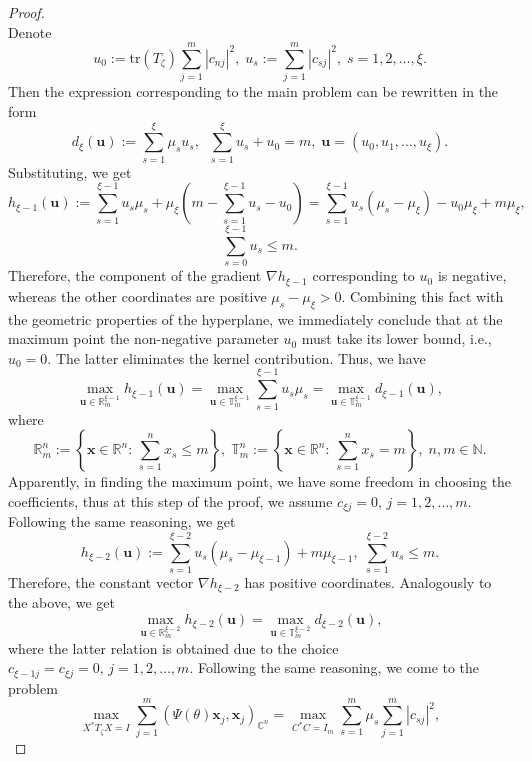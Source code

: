 \documentclass[a4paper,twoside,12pt]{article}
\begin{document}
\begin{proof}
$$$$
Denote
$$
u_{0}:=\mathrm{tr}(T_{\zeta})\sum\limits_{j=1}^{m}|c _{nj }|^{2},\;u_{s}:=\sum\limits_{j=1}^{m}  |c_{sj }|^{2},\;s=1,2,\ldots,\xi.
$$
Then  the expression corresponding to the  main problem can be rewritten in the form
$$
d_{\xi}(\mathbf{u}) :=\sum\limits_{s=1}^{\xi}\mu _{s}u_{s}  ,\;\;\sum\limits_{s=1}^{\xi}u_{s}+u_{0}=m,\;\mathbf{u}=(u_{0},u_{1},\ldots,u_{\xi}).
$$
Substituting, we get
$$
h_{\xi-1}(\mathbf{u}):=\sum\limits_{s=1}^{\xi-1}u_{s}\mu _{s}+\mu _{\xi}\left(m-\sum\limits_{s=1}^{\xi-1}u_{s}-u_{0}\right)=
\sum\limits_{s=1}^{\xi-1}u_{s} \left(\mu _{s}-\mu_{\xi}\right)-u_{0}\mu _{\xi}+m \mu _{\xi},
$$
$$
\sum\limits_{s=0}^{\xi-1}u_{s}\leq m.
$$
Therefore, the component of the gradient $\nabla h_{\xi-1}$ corresponding to   $u_{0}$ is   negative, whereas the  other  coordinates are positive  $ \mu_s - \mu_{\xi} > 0.$ Combining this fact with the geometric properties of the hyperplane, we immediately conclude that at the maximum point the non-negative parameter $u_{0}$ must take  its lower bound, i.e., $u_{0} = 0.$ The latter eliminates the kernel contribution. Thus, we  have
$$
\max \limits_{\mathbf{u}\in \mathbb{R}^{\xi-1}_{m}}  h_{\xi-1}(\mathbf{u})= \max\limits_{\mathbf{u}\in \mathbb{T}^{\xi-1}_{m}}\sum\limits_{s=1}^{\xi-1}u_{s}\mu_{s}=  \max\limits_{\mathbf{u}\in \mathbb{T}^{\xi-1}_{m}}  d_{\xi-1}(\mathbf{u}),
$$
where
$$
\mathbb{R}^{n}_{m}:=\left\{\mathbf{x}\in \mathbb{R}^{n}:\, \sum\limits_{s=1}^{n}x_{s}\leq m \right\},\;\mathbb{T}^{n}_{m}:=\left\{\mathbf{x}\in \mathbb{R}^{n}:\, \sum\limits_{s=1}^{n}x_{s}= m \right\},\;n,m\in \mathbb{N}.
$$
Apparently, in finding the maximum point, we have some freedom in choosing the coefficients, thus at this step of the proof, we   assume    $c_{\xi j}=0,\,j=1,2,\ldots,m.$
Following  the same reasoning, we get
\begin{equation*}
h_{\xi-2}(\mathbf{u}):=
\sum\limits_{s=1}^{\xi-2}u_{s} \left(\mu _{s}-\mu _{\xi-1}\right)+m \mu _{\xi-1},\;\sum\limits_{s=1}^{\xi-2}u_{s}\leq m.
\end{equation*}
Therefore, the constant vector $\nabla h_{\xi-2}$ has positive coordinates. Analogously to the above, we get
$$
\max\limits_{\mathbf{u}\in \mathbb{R}^{\xi-2}_{m}}  h_{\xi-2}(\mathbf{u})=   \max\limits_{\mathbf{u}\in \mathbb{T}^{\xi-2}_{m}}  d_{\xi-2}(\mathbf{u}),
$$
where the latter relation is obtained due to the choice  $c_{\xi-1j}=c_{\xi j}=0,\,j=1,2,\ldots,m.$
Following the same reasoning, we come to the problem
$$
\max\limits_{X^{\ast}T_{\zeta}X= I} \sum\limits_{j=1}^{m}(\Psi(\theta)\mathbf{x}_{j},\mathbf{x}_{j})_{\mathbb{C}^{n}}=\max\limits_{ C ^{\ast} C =I_{m}} \sum\limits_{s=1}^{m}\mu _{s} \sum\limits_{j=1}^{m}  |c_{sj }|^{2},
$$
\end{proof}
\end{document}
